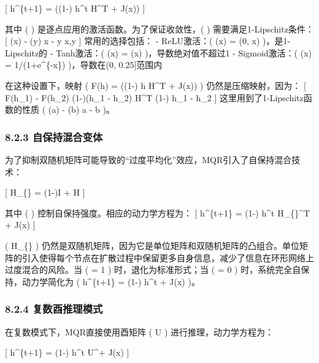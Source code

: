 \documentclass[
  12pt,
]{article}
\begin{document}
{[} h\^{}\{t+1\} = \sigma\left((1-\alpha) h\^{}t H\^{}T +
\alpha J(x)\right) {]}

其中 ( \sigma ) 是逐点应用的激活函数。为了保证收敛性，( \sigma )
需要满足1-Lipschitz条件： {[} \textbar{}\sigma(x) - \sigma(y)\textbar{}
\leq \textbar x - y\textbar{} \quad \forall x,y {]} 常用的选择包括： -
ReLU激活：( \sigma(x) = \max(0, x) )，是1-Lipschitz的 - Tanh激活：(
\sigma(x) = \tanh(x) )，导数绝对值不超过1 - Sigmoid激活：( \sigma(x) =
1/(1+e\^{}\{-x\}) )，导数在(0, 0.25{]}范围内

在这种设置下，映射 ( F(h) = \sigma((1-\alpha) h H\^{}T +
\alpha J(x)) ) 仍然是压缩映射，因为： {[}
\textbar{}F(h\_1) - F(h\_2)\textbar{}
\leq \textbar(1-\alpha)(h\_1 - h\_2) H\^{}T\textbar{} \leq (1-\alpha)
\textbar h\_1 - h\_2\textbar{} {]} 这里用到了1-Lipschitz函数的性质 (
\textbar{}\sigma(a) - \sigma(b)\textbar{} \leq \textbar a - b\textbar{}
)。

\hypertarget{ux81eaux4fddux6301ux6df7ux5408ux53d8ux4f53}{%
\subsubsection{8.2.3
自保持混合变体}\label{ux81eaux4fddux6301ux6df7ux5408ux53d8ux4f53}}

为了抑制双随机矩阵可能导致的``过度平均化''效应，MQR引入了自保持混合技术：

{[} H\_\{\} = (1-\beta)I + \beta H {]}

其中 ( \beta \in [0,1] ) 控制自保持强度。相应的动力学方程为： {[}
h\^{}\{t+1\} = (1-\alpha) h\^{}t H\_\{\}\^{}T +
\alpha J(x) {]}

( H\_\{\} )
仍然是双随机矩阵，因为它是单位矩阵和双随机矩阵的凸组合。单位矩阵的引入使得每个节点在扩散过程中保留更多自身信息，减少了信息在环形网络上过度混合的风险。当
( \beta = 1 ) 时，退化为标准形式；当 ( \beta = 0 )
时，系统完全自保持，动力学简化为 ( h\^{}\{t+1\} = (1-\alpha) h\^{}t +
\alpha J(x) )。

\hypertarget{ux590dux6570ux9149ux63a8ux7406ux6a21ux5f0f-1}{%
\subsubsection{8.2.4
复数酉推理模式}\label{ux590dux6570ux9149ux63a8ux7406ux6a21ux5f0f-1}}

在复数模式下，MQR直接使用酉矩阵 ( U ) 进行推理，动力学方程为：

{[} h\^{}\{t+1\} = (1-\alpha) h\^{}t U\^{}\dagger +
\alpha J(x) {]}
\end{document}
